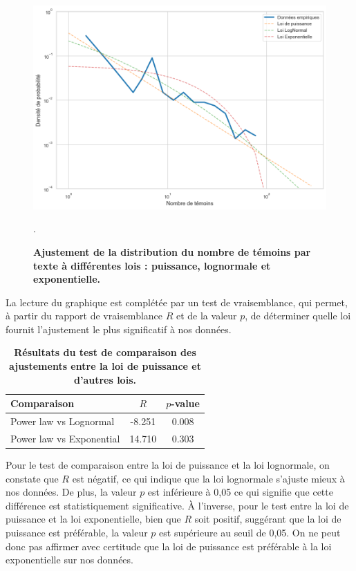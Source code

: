 \documentclass[a4paper,twoside,12pt]{book}
\begin{document}
\begin{figure}[H]
	\centering
	\includegraphics[width=\textwidth]{img/comparelaw.png} 
	\caption{\textbf{Ajustement de la distribution du nombre de témoins par texte à différentes lois : puissance, lognormale et exponentielle.}}. 
	\label{fig:monimage}
\end{figure}

La lecture du graphique est complétée par un test de vraisemblance, qui permet, à partir du rapport de vraisemblance \(R\) et de la valeur \(p\), de déterminer quelle loi fournit l’ajustement le plus significatif à nos données.

\begin{table}[h!]
	\centering
	\begin{tabular}{lcc}
		\hline
		Comparaison & \(R\) & \(p\)-value \\
		\hline
		Power law vs Lognormal & -8.251 & 0.008 \\
		Power law vs Exponential & 14.710 & 0.303 \\
		\hline
	\end{tabular}
	\caption{\textbf{Résultats du test de comparaison des ajustements entre la loi de puissance et d’autres lois.}}
	\label{tab:distribution_compare}
\end{table}

Pour le test de comparaison entre la loi de puissance et la loi lognormale, on constate que \(R\) est négatif, ce qui indique que la loi lognormale s’ajuste mieux à nos données. De plus, la valeur \(p\) est inférieure à 0,05 ce qui signifie que cette différence est statistiquement significative. À l’inverse, pour le test entre la loi de puissance et la loi exponentielle, bien que \(R\) soit positif, suggérant que la loi de puissance est préférable, la valeur \(p\) est supérieure au seuil de 0,05. On ne peut donc pas affirmer avec certitude que la loi de puissance est préférable à la loi exponentielle sur nos données. \\
\end{document}
